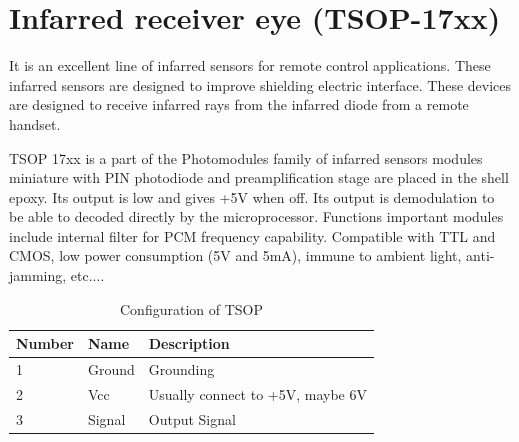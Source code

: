 \documentclass[a4paper]{report}
\begin{document}
    \section{Infarred receiver eye (TSOP-17xx)}
        It is an excellent line of infarred sensors for remote control applications. These infarred 
        sensors are designed to improve shielding electric interface. These devices are designed to 
        receive infarred rays from the infarred diode from a remote handset. 
        \linebreak
        \par TSOP 17xx is a part of the Photomodules family of infarred sensors modules miniature with PIN 
        photodiode and preamplification stage are placed in the shell epoxy. Its output is low and 
        gives +5V when off. Its output is demodulation to be able to decoded directly by the microprocessor. 
        Functions important modules include internal filter for PCM frequency capability. Compatible 
        with TTL and CMOS, low power consumption (5V and 5mA), immune to ambient light, anti-jamming, etc....
        \begin{table}[ht]
            \centering
            \begin{tabular} { | l | l | l | }
                \hline
                Number & Name & Description \\ \hline
                1 & Ground & Grounding \\ \hline
                2 & Vcc & Usually connect to +5V, maybe 6V \\ \hline
                3 & Signal & Output Signal \\
                \hline
            \end{tabular}
            \caption{\label{tab:second}Configuration of TSOP}
        \end{table}
        
\end{document}
